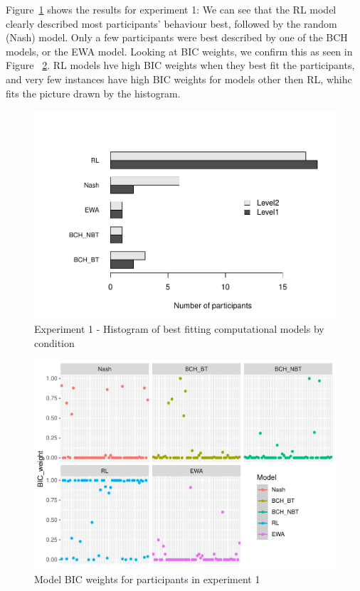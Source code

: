 \documentclass[man,floatsintext]{apa6}
\begin{document}
Figure~\ref{fig:exp1-comp-models} shows the results for experiment 1: We can see that the RL model clearly described most participants' behaviour best, followed by the random (Nash) model. Only a few participants were best described by one of the BCH models, or the EWA model. Looking at BIC weights, we confirm this as seen in Figure ~\ref{fig:xp1-BIC-weigths}. RL models hve high BIC weights when they best fit the participants, and very few instances have high BIC weights for models other then RL, whihc fits the picture drawn by the histogram.

\begin{figure}

{\centering \includegraphics[width=\textwidth]{paper_draft_2021_files/figure-latex/exp1-comp-models-1} 

}

\caption{Experiment 1 - Histogram of best fitting computational models by condition}\label{fig:exp1-comp-models}
\end{figure}



\begin{figure}

{\centering \includegraphics{paper_draft_2021_files/figure-latex/xp1-BIC-weigths-1} 

}

\caption{Model BIC weights for participants in experiment 1}\label{fig:xp1-BIC-weigths}
\end{figure}
\end{document}
